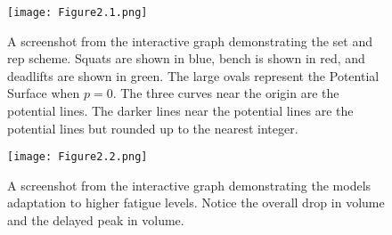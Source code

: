 \begin{figure}[h]
    \centering
    \texttt{[image: Figure2.1.png]}
    \caption{A screenshot from the interactive graph demonstrating the set and rep scheme. Squats are shown in blue, bench is shown in red, and deadlifts are shown in green. The large ovals represent the Potential Surface when $p=0$. The three curves near the origin are the potential lines. The darker lines near the potential lines are the potential lines but rounded up to the nearest integer.}
    \label{fig:Figure2.1}
\end{figure}
\begin{figure}[h]
    \centering
    \texttt{[image: Figure2.2.png]}
    \caption{A screenshot from the interactive graph demonstrating the models adaptation to higher fatigue levels. Notice the overall drop in volume and the delayed peak in volume.}
    \label{fig:Figure2.2}
\end{figure}
